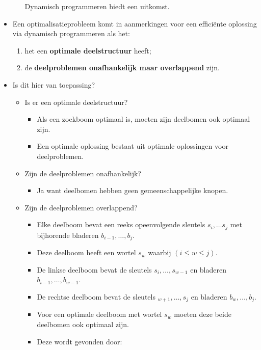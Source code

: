 \begin{itemize}
\begin{itemize}
        \good Dynamisch programmeren biedt een uitkomst.
    \end{itemize}
    \item Een optimalisatieprobleem komt in aanmerkingen voor een efficiënte oplossing via dynamisch programmeren als het:
    \begin{enumerate}
        \item het een \textbf{optimale deelstructuur} heeft;
        \item de \textbf{deelproblemen onafhankelijk maar overlappend} zijn.
    \end{enumerate}
    \item Is dit hier van toepassing?
    \begin{itemize}
        \item Is er een optimale deelstructuur?
        \begin{itemize}
            \item Als een zoekboom optimaal is, moeten zijn deelbomen ook optimaal zijn.
            \item Een optimale oplossing bestaat uit optimale oplossingen voor deelproblemen.
        \end{itemize}
        \item Zijn de deelproblemen onafhankelijk?
        \begin{itemize}
            \item Ja want deelbomen hebben geen gemeenschappelijke knopen.
        \end{itemize}
        \item Zijn de deelproblemen overlappend?
        \begin{itemize}
            \item Elke deelboom bevat een reeks opeenvolgende sleutels $s_i, \dots s_j$ met bijhorende bladeren $b_{i - 1}, \dots, b_j$.
            \item Deze deelboom heeft een wortel $s_w$ waarbij $(i \leq w \leq j)$.
            \item De linkse deelboom bevat de sleutels $s_i, \dots, s_{w - 1}$ en bladeren $b_{i - 1}, \dots, b_{w - 1}$.
            \item De rechtse deelboom bevat de sleutels $_{w + 1}, \dots, s_j$ en bladeren $b_{w}, \dots, b_j$.
            \item Voor een optimale deelboom met wortel $s_w$ moeten deze beide deelbomen ook optimaal zijn.
            \item Deze wordt gevonden door:
            \begin{enumerate}

\end{enumerate}
\end{itemize}
\end{itemize}
\end{itemize}
